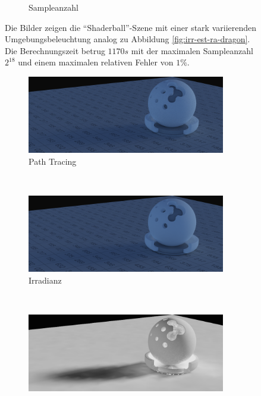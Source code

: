 \begin{figure}[h]
\begin{subfigure}[t]{0.33\textwidth}
			\caption{Sampleanzahl}
		\end{subfigure}
		\caption[Erste adaptive Vertex-Irradiance-Map anhand der \enquote{Shaderball}-Szene]{Die Bilder zeigen die \enquote{Shaderball}-Szene mit einer stark variierenden Umgebungsbeleuchtung analog zu Abbildung \ref{fig:irr-est-ra-dragon}. Die Berechnungszeit betrug $1170\unit{s}$ mit der maximalen Sampleanzahl $2^{18}$ und einem maximalen relativen Fehler von $1\unit{\%}$.}
		\label{fig:irr-est-ra-shaderball}
	\end{figure}

	\begin{figure}[h]
		\begin{subfigure}[t]{\textwidth}
			\center
			\includegraphics[width=0.95\textwidth]{pic/irr_est-ra-shaderball3-ref.png}
			\caption{Path Tracing}
		\end{subfigure}
		\medskip \\
		\begin{subfigure}[t]{\textwidth}
			\center
			\includegraphics[width=0.95\textwidth]{pic/irr_est-ra-shaderball3-irr.png}
			\caption{Irradianz}
		\end{subfigure}
		\medskip \\
		\begin{subfigure}[t]{\textwidth}
			\center
			\includegraphics[width=0.95\textwidth]{pic/irr_est-ra-shaderball3-scount.png}

\end{subfigure}
\end{figure}
